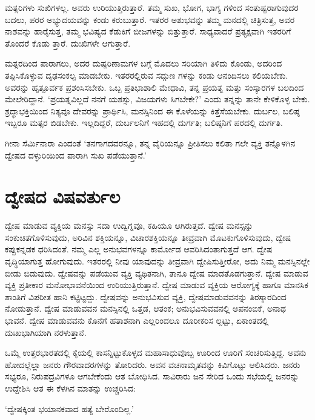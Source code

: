 ಮತ್ಸರಿಗಳು ಸುಖಿಗಳಲ್ಲ. ಅವರು ಉರಿಯುತ್ತಿರುತ್ತಾರೆ. ತಮ್ಮ ಸುಖ, ಭೋಗ, ಭಾಗ್ಯ ಗಳಿಂದ ಸಂತುಷ್ಟರಾಗುವುದರ ಬದಲು, ಪರರ ಅಭ್ಯುದಯವನ್ನು ಕಂಡು ಕರುಬುತ್ತಾರೆ. ಇತರರ ಅಶುಭವನ್ನು ತಮ್ಮ ಮನದಲ್ಲಿ ಚಿತ್ರಿಸುತ್ತ, ಅವರ ನಾಶವನ್ನು ಹಾರೈಸುತ್ತ, ತಮ್ಮ ಭವಿಷ್ಯದ ಕೆಡುಕಿಗೆ ಬೀಜಗಳನ್ನು ಬಿತ್ತುತ್ತಾರೆ. ಸಾಧ್ಯವಾದರೆ ಪ್ರತ್ಯಕ್ಷವಾಗಿ ಇತರರಿಗೆ ತೊಂದರೆ ಕೊಡು ತ್ತಾರೆ. ದುಃಖಿಗಳೇ ಆಗುತ್ತಾರೆ.

ಮತ್ಸರದಿಂದ ಪಾರಾಗಲು, ಅದರ ದುಷ್ಪರಿಣಾಮಗಳ ಬಗ್ಗೆ ಮೊದಲು ಸರಿಯಾಗಿ ತಿಳಿದು ಕೊಂಡು, ಅದರಿಂದ ತಪ್ಪಿಸಿಕೊಳ್ಳುವ ದೃಢಸಂಕಲ್ಪ ಮಾಡಬೇಕು. ಇತರರಲ್ಲಿರುವ ಸದ್ಗುಣ ಗಳನ್ನು ಕಂಡು ಆನಂದಿಸಲು ಕಲಿಯಬೇಕು. ಅವರನ್ನು ಹೃತ್ಪೂರ್ವಕ ಪ್ರಶಂಸಿಸಬೇಕು. ಒಬ್ಬ ಪ್ರತಿಭಾಶಾಲಿ ಮೇಧಾವಿ, ತನ್ನ ಪ್ರಯತ್ನ ಮತ್ತು ಸಂಸ್ಕಾರಗಳ ಬಲದಿಂದ ಮೇಲೇರಿದ್ದಾನೆ. ‘ಪ್ರಯತ್ನವಿಲ್ಲದೆ ನನಗೆ ಯಶಸ್ಸು, ವಿಜಯಗಳು ಸಿಗಬೇಕೇ?’ ಎಂದು ತನ್ನನ್ನು ತಾನೇ ಕೇಳಿಕೊಳ್ಳ ಬೇಕು. ಶ್ರದ್ಧಾಭಕ್ತಿಯಿಂದ ನಿತ್ಯವೂ ದೇವರನ್ನು ಪ್ರಾರ್ಥಿಸಿ, ಮನಸ್ಸಿನಿಂದ ಈ ಕೊಳೆಯನ್ನು ಕಿತ್ತೆಸೆಯಬೇಕು. ದುರ್ಬಲ, ಬಲಿಷ್ಠ ಇಬ್ಬರೂ ಮತ್ಸರ ಬಿಡಬೇಕು. ಇಲ್ಲದಿದ್ದರೆ, ದುರ್ಬಲನಿಗೆ ಇಹದಲ್ಲಿ ದುರ್ಗತಿ; ಬಲಿಷ್ಠನಿಗೆ ಪರದಲ್ಲಿ ದುರ್ಗತಿ.

ಗೀನಾ ಸೆರ್ಮಿನಾರಾ ಎಂದಂತೆ ‘ತನಗಾಗದವರನ್ನೂ, ತನ್ನ ವೈರಿಯನ್ನೂ ಪ್ರೀತಿಸಲು ಕಲಿತಾ ಗಲೇ ವ್ಯಕ್ತಿ ತನ್ನೊಳಗಿನ ದ್ವೇಷದ ದಳ್ಳುರಿಯಿಂದ ಪಾರಾಗಿ ಸುಖ ಪಡೆಯುತ್ತಾನೆ.’


\section{ದ್ವೇಷದ ವಿಷವರ್ತುಲ}

ದ್ವೇಷ ಮಾಡುವ ವ್ಯಕ್ತಿಯ ಮನಸ್ಸು ಸದಾ ಉದ್ವಿಗ್ನವೂ, ಕಹಿಯೂ ಆಗಿರುತ್ತದೆ. ದ್ವೇಷ ಮನಸ್ಸನ್ನು ಸಂಕುಚಿತಗೊಳಿಸುವುದು, ಅರಿವಿನ ಶಕ್ತಿಯನ್ನೂ, ವಿಚಾರಶಕ್ತಿಯನ್ನೂ ತೀವ್ರವಾಗಿ ಮೊಟಕುಗೊಳಿಸುವುದು, ದ್ವೇಷ ಕಪ್ಪುಕನ್ನಡಕ ಧರಿಸಿದಂತೆ. ನಮ್ಮ ಎಲ್ಲ ಅನುಭವಗಳನ್ನೂ ಕಾರ್ಮೋಡ ಆವರಿಸಿದಂತಾಗುತ್ತದೆ ಆಗ. ದ್ವೇಷ ವೃದ್ಧಿಯಾಗುತ್ತ ಹೋಗುವುದು. ಇತರರಲ್ಲಿ ನೀವು ಯಾವುದನ್ನು ತೀವ್ರವಾಗಿ ದ್ವೇಷಿಸುತ್ತೀರೋ, ಅದು ನಿಮ್ಮ ಮನಸ್ಸಿನಲ್ಲೇ ಬೀಡು ಬಿಡುವುದು. ದ್ವೇಷವನ್ನು ಪಡೆಯುವ ವ್ಯಕ್ತಿ ವ್ಯಥಿತನಾಗಿ, ತಾನೂ ದ್ವೇಷ ಮಾಡತೊಡಗುತ್ತಾನೆ. ದ್ವೇಷ ಮಾಡುವ ವ್ಯಕ್ತಿ ಪ್ರತೀಕಾರ ಮನೋಭಾವನೆಯಿಂದ ಉರಿಯುತ್ತಿರುತ್ತಾನೆ. ದ್ವೇಷ ಮಾಡುವ ವ್ಯಕ್ತಿಯ ಆರೋಗ್ಯಕ್ಕೆ ಹಾಗೂ ಮಾನಸಿಕ ಶಾಂತಿಗೆ ವಿಪರೀತ ಹಾನಿ ಕಟ್ಟಿಟ್ಟದ್ದು. ದ್ವೇಷವನ್ನು ಅನುಭವಿಸುವ ವ್ಯಕ್ತಿ, ದ್ವೇಷಮಾಡುವವನನ್ನು ತಿರಸ್ಕಾರದಿಂದ ನೋಡುತ್ತಾನೆ. ದ್ವೇಷ ಮಾಡುವವನ ಮನಸ್ಸಿನಲ್ಲಿ ಒತ್ತಡ, ಆತಂಕ; ಅನುಭವಿಸುವವನಲ್ಲಿ ಅಪನಂಬಿಕೆ, ಅನಾಥ ಭಾವನೆ. ದ್ವೇಷ ಮಾಡುವವನು ಕೊನೆಗೆ ಹತಾಶನಾಗಿ ಎಲ್ಲರಿಂದಲೂ ದೂರೀಕರಿಸ ಲ್ಪಟ್ಟು, ಏಕಾಂತದಲ್ಲಿ ದುಃಖಭಾಗಿಯಾಗಿ ನರಳುತ್ತಾನೆ.

ಒಮ್ಮೆ ಉತ್ತರಭಾರತದಲ್ಲಿ ಕೈಯಲ್ಲಿ ಕಾಸನ್ನಿಟ್ಟುಕೊಳ್ಳದ ಮಹಾಸಾಧುವೊಬ್ಬ ಊರಿಂದ ಊರಿಗೆ ಸಂಚರಿಸುತ್ತಿದ್ದ. ಅವನು ಹೋದಲ್ಲೆಲ್ಲಾ ಜನರು ಗೌರವಾದರಗಳನ್ನು ತೋರಿದರು. ಅವನ ವಚನಾಮೃತವನ್ನು ಕಿವಿಗೊಟ್ಟು ಆಲಿಸಿದರು. ಜನರು ಸಭ್ಯರೂ, ನಿರುಪದ್ರವಿಗಳೂ ಆಗಬೇಕೆಂದು ಆತ ಬೋಧಿಸಿದ. ಸಾವಿರಾರು ಜನ ಸೇರಿದ ಒಂದು ಸಭೆಯಲ್ಲಿ ಜನರನ್ನು ಉದ್ದೇಶಿಸಿ ಆತ ಈ ಕೆಳಗಿನ ಮಾತನ್ನು ಉಚ್ಚರಿಸಿದ:

‘ದ್ವೇಷಕ್ಕಿಂತ ಭಯಾನಕವಾದ ಹತ್ಯೆ ಬೇರೊಂದಿಲ್ಲ.’

